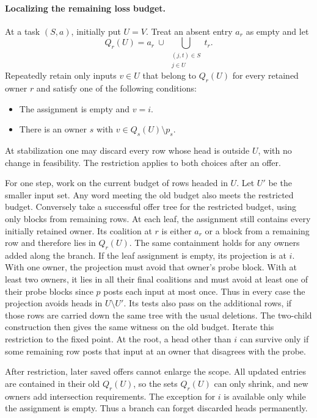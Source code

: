 \paragraph{Localizing the remaining loss budget.}
At a task $(S,a)$, initially put $U=V$. Treat an
absent entry $a_r$ as empty and let
\[
  Q_r(U)=a_r\ \cup\
      \bigcup_{\substack{(j,t)\in S\\ j\in U}}t_r .
\]
Repeatedly retain only inputs $v\in U$ that belong to
$Q_r(U)$ for every retained owner $r$ and satisfy one
of the following conditions:
\begin{itemize}
\item The assignment is empty and $v=i$.
\item There is an owner $s$ with $v\in Q_s(U)\setminus p_s$.
\end{itemize}
At stabilization one may discard every row whose head
is outside $U$, with no change in feasibility. The
restriction applies to both choices after an offer.

For one step, work on the current budget of rows headed
in $U$. Let $U'$ be the smaller input set. Any word
meeting the old budget also meets the restricted budget.
Conversely take a successful offer tree for the
restricted budget, using only blocks from remaining
rows. At each leaf, the assignment still contains
every initially retained owner. Its coalition at $r$
is either $a_r$ or a block from a remaining row and
therefore lies in $Q_r(U)$. The same containment
holds for any owners added along the branch.
If the leaf assignment is empty, its projection is
at $i$. With one owner, the projection must avoid
that owner's probe block. With at least two owners,
it lies in all their final coalitions and must avoid
at least one of their probe blocks since $p$ posts
each input at most once. Thus in every case the
projection avoids heads in $U\setminus U'$. Its tests
also pass on the additional rows, if those rows are
carried down the same tree with the usual deletions.
The two-child construction then gives the same witness
on the old budget. Iterate this restriction to the
fixed point. At the root, a head other than $i$ can
survive only if some remaining row posts that input
at an owner that disagrees with the probe.

After restriction, later saved offers cannot enlarge the
scope. All updated entries are contained in their old
$Q_r(U)$, so the sets $Q_r(U)$ can only shrink, and
new owners add intersection requirements. The
exception for $i$ is available only while the
assignment is empty. Thus a branch can forget
discarded heads permanently.

